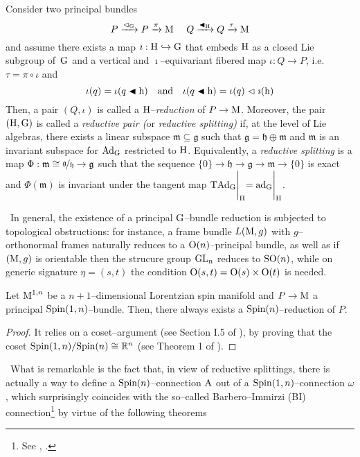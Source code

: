 \begin{defi}
Consider two principal bundles $$P\xrightarrow{\vartriangleleft_{\text{\normalfont G}}}P\xrightarrow{\pi}\text{\normalfont M}\,\quad\,Q\xrightarrow{\blacktriangleleft_{\text{\normalfont H}}}Q\xrightarrow{\tau}\text{\normalfont M}$$ 
and assume there exists a map $\imath:\text{\normalfont H}\hookrightarrow\text{\normalfont G}$ that embeds $\text{\normalfont H}$ as a closed Lie subgroup of \,$\text{\normalfont G}$ and a vertical and $\imath$--equivariant fibered map $\iota:Q\to P$, i.e. $\tau=\pi\circ\iota$ and
$$\iota(q)=\iota(q\blacktriangleleft\text{\normalfont h})\quad\text{and}\quad\iota(q\blacktriangleleft\text{\normalfont h})=\iota(q)\vartriangleleft\imath(\text{\normalfont h})$$
Then, a pair $(Q,\iota)$ is called a $\text{\normalfont H}$--\emph{reduction} of $P\to\text{\normalfont M}$. Moreover, the pair $(\text{\normalfont H},\text{\normalfont G})$ is called a \emph{reductive pair (}or \emph{reductive splitting)} if, at the level of Lie algebras, there exists a linear subspace $\mathfrak{m}\subseteq\mathfrak{g}$ such that $\mathfrak{g}=\mathfrak{h}\oplus\mathfrak{m}$ and $\mathfrak{m}$ is an invariant subspace for $\text{\normalfont Ad}_{\text{\normalfont G}}$ restricted to $\text{\normalfont H}$. Equivalently, a \emph{reductive splitting} is a map $\Phi:\mathfrak{m}\cong\nicefrac{\mathfrak{g}}{\mathfrak{h}}\to\mathfrak{g}$ such that the sequence $\{0\}\to\mathfrak{h}\to\mathfrak{g}\to\mathfrak{m}\to\{0\}$ is exact and $\Phi(\mathfrak{m})$ is invariant under the tangent map ${\text{\normalfont T}\text{\normalfont Ad}_{\text{\normalfont G}}}\Biggl|_{\text{\normalfont H}}=\text{\normalfont ad}_{\text{\normalfont G}}\Bigg|_{\text{\normalfont H}}$.
\end{defi}
\,\newline
In general, the existence of a principal $\text{\normalfont G}$--bundle reduction is subjected to topological obstructions: for instance, a frame bundle $L(\text{\normalfont M},g)$ with $g$--orthonormal frames naturally reduces to a $\text{\normalfont O}(n)$--principal bundle, as well as if $(\text{\normalfont M},g)$ is orientable then the strucure group $\text{\normalfont GL}_n$ reduces to $\text{\normalfont SO}(n)$, while on generic signature $\eta=(s,t)$ the condition $\text{\normalfont O}(s,t)=\text{\normalfont O}(s)\times\text{\normalfont O}(t)$ is needed.

\begin{teo}
    Let $\text{\normalfont M}^{1,n}$ be a $n+1$--dimensional Lorentzian spin manifold and $P\to\text{\normalfont M}$ a principal $\text{\normalfont Spin}(1,n)$--bundle. Then, there always exists a $\text{\normalfont Spin}(n)$--reduction of $P$. 
\end{teo}
\begin{proof}
    It relies on a coset--argument (see Section I.5 of \cite{kobayashi1}), by proving that the coset ${\text{\normalfont Spin}(1,n)}/{\text{\normalfont Spin}(n)}\cong\mathbb{R}^n$ (see Theorem 1 of \cite{OF1}).
\end{proof}
\,\newline
What is remarkable is the fact that, in view of reductive splittings, there is actually a way to define a $\text{\normalfont Spin}(n)$--connection $\text{\normalfont A}$ out of a $\text{\normalfont Spin}(1,n)$--connection $\omega$, which surprisingly coincides with the so--called Barbero--Immirzi (BI) connection\footnote{See \cite{FFR1}, \cite{FFR2}.} by virtue of the following theorems


